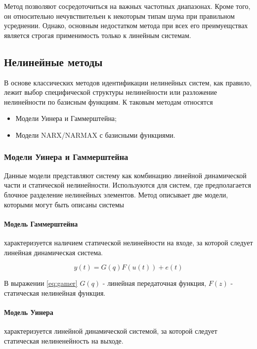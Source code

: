 Метод позволяют сосредоточиться на важных частотных диапазонах. Кроме того, он
относительно нечувствительен к некоторым типам шума при правильном усреднении.
Однако, основным недостатком метода при всех его преимуещствах является строгая
применимость только к линейным системам.

\subsection{Нелинейные методы}

В основе классических методов идентификации нелинейных систем, как правило,
лежит выбор специфической структуры нелинейности или разложение нелинейности по
базисным функциям. К таковым методам относятся

\begin{itemize}
  \item Модели Уинера и Гаммерштейна;
  \item Модели NARX/NARMAX с базисными функциями.
\end{itemize}

\subsubsection{Модели Уинера и Гаммерштейна}

Данные модели представляют систему как комбинацию линейной динамической части и
статической нелинейности. Используются для систем, где предполагается блочное
разделение нелинейных элементов. Метод описывает две модели, которыми могут быть
описаны системы

\paragraph{Модель Гаммерштейна} характеризуется наличием статической
нелинейности на входе, за которой следует линейная динамическая система.

\begin{equation}
  y(t)=G(q)F(u(t))+e(t)
  \label{eq:gamer}
\end{equation}

В выражении \ref{eq:gamer} $G(q)$ - линейная передаточная функция, $F(z)$ -
статическая нелинейная функция. 

\paragraph{Модель Уинера} характеризуется линейной динамической системой, за
которой следует статическая нелиненейность на выходе.

